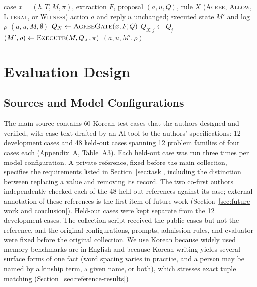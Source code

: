 \documentclass[acmsmall,review,anonymous]{acmart}
\newcommand{\agree}{\textsc{Agree}}
\newcommand{\allow}{\textsc{Allow}}
\newcommand{\literal}{\textsc{Literal}}
\newcommand{\witness}{\textsc{Witness}}
\begin{document}
\begin{algorithm}[tbp]
\caption{Admission on a fixed proposal. Reply rendering is a separate downstream option.}\label{alg:1}
\begin{algorithmic}[1]
\Require case $x=(h,T,M,\pi)$, extraction $F$, proposal $(a,u,Q)$, rule $X$ (\agree{}, \allow{}, \literal{}, or \witness{})
\Ensure action $a$ and reply $u$ unchanged; executed state $M'$ and log $\rho$
  \State \Return $(a,u,M,\emptyset)$ 
\EndIf
\State $Q_X \gets \textsc{AgreeGate}(x,F,Q)$ 
  \If{$X=\allow$ \textbf{or} ($X=\literal$ \textbf{and} $L_j=1$) \textbf{or} ($X=\witness$ \textbf{and} $W_j=1$)}
    \State $Q_{X,j}\gets Q_j$ 
  \EndIf
\EndFor
\State $(M',\rho)\gets \textsc{Execute}(M,Q_X,\pi)$
\State \Return $(a,u,M',\rho)$
\end{algorithmic}
\end{algorithm}

\section{Evaluation Design}\label{sec:design}
\subsection{Sources and Model Configurations}\label{sec:sources}
The main source contains 60 Korean test cases that the authors designed and verified, with case text drafted by an AI tool to the authors' specifications: 12 development cases and 48 held-out cases spanning 12 problem families of four cases each (Appendix~A, Table~A3). Each held-out case was run three times per model configuration. A private reference, fixed before the main collection, specifies the requirements listed in Section~\ref{sec:task}, including the distinction between replacing a value and removing its record. The two co-first authors independently checked each of the 48 held-out references against its case; external annotation of these references is the first item of future work (Section~\ref{sec:future work and conclusion}). Held-out cases were kept separate from the 12 development cases. The collection script received the public cases but not the reference, and the original configurations, prompts, admission rules, and evaluator were fixed before the original collection. We use Korean because widely used memory benchmarks are in English \cite{cite20,cite37} and because Korean writing yields several surface forms of one fact (word spacing varies in practice, and a person may be named by a kinship term, a given name, or both), which stresses exact tuple matching (Section~\ref{sec:reference-results}).
\end{document}
